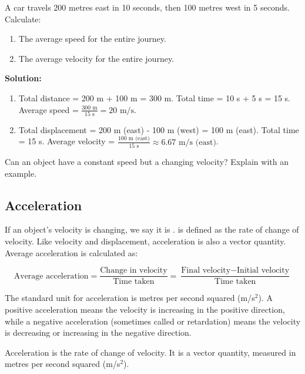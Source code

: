 \begin{example}
A car travels 200 metres east in 10 seconds, then 100 metres west in 5 seconds. Calculate:
\begin{enumerate}
    \item The average speed for the entire journey.
    \item The average velocity for the entire journey.
\end{enumerate}
\textbf{Solution:}
\begin{enumerate}
    \item Total distance = 200 m + 100 m = 300 m. Total time = 10 s + 5 s = 15 s.
    Average speed = $\frac{300 \text{ m}}{15 \text{ s}} = 20 \text{ m/s}$.
    \item Total displacement = 200 m (east) - 100 m (west) = 100 m (east). Total time = 15 s.
    Average velocity = $\frac{100 \text{ m (east)}}{15 \text{ s}} \approx 6.67 \text{ m/s (east)}$.
\end{enumerate}
\end{example}

\begin{stopandthink}
Can an object have a constant speed but a changing velocity? Explain with an example.
\end{stopandthink}

\subsection{Acceleration}

If an object's velocity is changing, we say it is .  is defined as the rate of change of velocity.  Like velocity and displacement, acceleration is also a vector quantity.  Average acceleration is calculated as:

\[ \text{Average acceleration} = \frac{\text{Change in velocity}}{\text{Time taken}} = \frac{\text{Final velocity} - \text{Initial velocity}}{\text{Time taken}} \]

The standard unit for acceleration is metres per second squared (m/s$^2$).  A positive acceleration means the velocity is increasing in the positive direction, while a negative acceleration (sometimes called  or retardation) means the velocity is decreasing or increasing in the negative direction.

\begin{keyconcept}{Acceleration}
 is the rate of change of velocity. It is a vector quantity, measured in metres per second squared (m/s$^2$).
\end{keyconcept}

